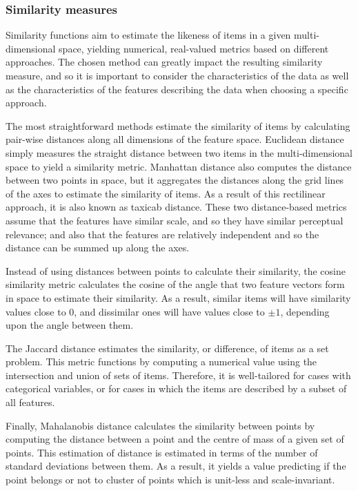 \subsubsection{Similarity measures}
Similarity functions aim to estimate the likeness of items in a given multi-dimensional space, yielding numerical, real-valued metrics based on different approaches. The chosen method can greatly impact the resulting similarity measure, and so it is important to consider the characteristics of the data as well as the characteristics of the features describing the data when choosing a specific approach.

The most straightforward methods estimate the similarity of items by calculating pair-wise distances along all dimensions of the feature space. 
Euclidean distance simply measures the straight distance between two items in the multi-dimensional space to yield a similarity metric.
Manhattan distance also computes the distance between two points in  space, but it aggregates the distances along the grid lines of the axes to estimate the similarity of items. As a result of this rectilinear approach, it is also known as taxicab distance.
These two distance-based metrics assume that the features have similar scale, and so they have similar perceptual relevance; and also that the features are relatively independent and so the distance can be summed up along the axes.

Instead of using distances between points to calculate their similarity, the cosine similarity metric calculates the cosine of the angle that two feature vectors form in space to estimate their similarity. As a result, similar items will have similarity values close to $0$, and dissimilar ones will have values close to $\pm 1$, depending upon the angle between them.

The Jaccard distance estimates the similarity, or difference, of items as a set problem. This metric functions by computing a numerical value using the intersection and union of sets of items. Therefore, it is well-tailored for cases with categorical variables, or for cases in which the items are described by a subset of all features.

Finally, Mahalanobis distance calculates the similarity between points by computing the distance between a point and the centre of mass of a given set of points. This estimation of distance is estimated in terms of the number of standard deviations between them. As a result, it yields a value predicting if the point belongs or not to cluster of points which is unit-less and scale-invariant.




